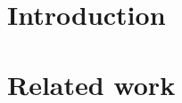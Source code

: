 \documentclass[11pt]{article}
\theoremstyle{definition}
\theoremstyle{plain}
\theoremstyle{remark}
\begin{document}
\section{Introduction}
%
%
%
%

\section{Related work}
\end{document}
